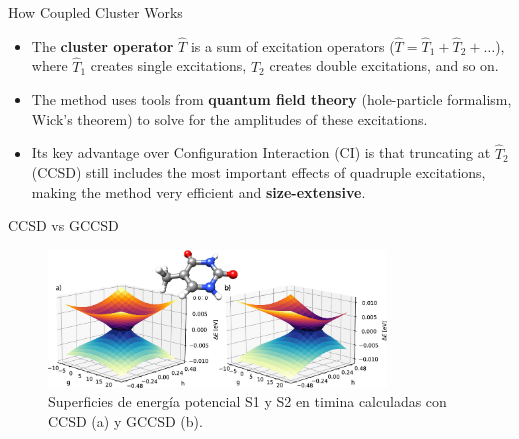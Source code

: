 
\begin{frame}{How Coupled Cluster Works}
    \begin{itemize}
        \item The \textbf{cluster operator} $\hat{T}$ is a sum of excitation operators ($\hat{T} = \hat{T}_1 + \hat{T}_2 + \dots$), where $\hat{T}_1$ creates single excitations, $\hat{T}_2$ creates double excitations, and so on.
        \pause
        \bigskip
        \item The method uses tools from \textbf{quantum field theory} (hole-particle formalism, Wick's theorem) to solve for the amplitudes of these excitations.
        \pause
        \bigskip
        \item Its key advantage over Configuration Interaction (CI) is that truncating at $\hat{T}_2$ (CCSD) still includes the most important effects of quadruple excitations, making the method very efficient and \textbf{size-extensive}.
    \end{itemize}
\end{frame}

\begin{frame}{CCSD vs GCCSD}
    \begin{figure}
        \includegraphics[width=0.8\textwidth]{images/CCSD.jpeg}
        \caption{Superficies de energía potencial S1 y S2 en timina calculadas con CCSD (a) y GCCSD (b).}
    \end{figure}
\end{frame}
